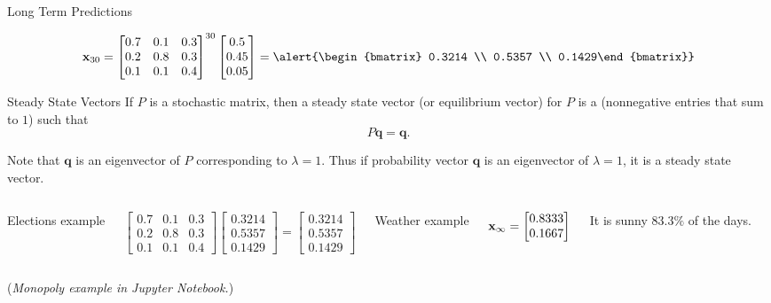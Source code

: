 \documentclass[xcolor=dvipsnames,aspectratio=169,t]{beamer}
\begin{document}
\begin{frame}{Long Term Predictions}
\vspace{-0.1in}

\pause
{\small
\[ \x_{30} =  \begin{bmatrix}
0.7 & 0.1 & 0.3 \\
0.2 & 0.8 & 0.3 \\
0.1 & 0.1 & 0.4 \end{bmatrix}^{30} \begin{bmatrix} 0.5 \\ 0.45 \\ 0.05 \end{bmatrix} = 
\alert{\begin{bmatrix} 0.3214 \\ 0.5357 \\  0.1429\end{bmatrix}} \] }
\end{frame}


\begin{frame}{Steady State Vectors}
  \bbox
  If $P$ is a stochastic matrix, then a \alert{steady state vector} (or \alert{equilibrium vector}) for $P$ is a  (nonnegative entries that sum to $1$) such that 
  \[ P \mathbf{q} = \mathbf{q}. \]

  \bi
  \ii Note that $\mathbf{q}$ is an eigenvector of $P$ corresponding to $\lambda = 1$.
  \ii Thus if probability vector $\mathbf{q}$ is an eigenvector of $\lambda =1$, it is a steady state vector.
  \ei
  \ebox

  \pause
  \begin{columns}[T]
  Elections example

  \[ \begin{bmatrix}
  0.7 & 0.1 & 0.3 \\
  0.2 & 0.8 & 0.3 \\
  0.1 & 0.1 & 0.4 \end{bmatrix} \begin{bmatrix} 0.3214 \\ 0.5357 \\  0.1429\end{bmatrix}  = \begin{bmatrix} 0.3214 \\ 0.5357 \\  0.1429\end{bmatrix} \]
  
  \pause
  
  Weather example
  \smallskip
  
  \qquad $\mathbf{x}_\infty = \begin{bmatrix} 0.8333 \\ 0.1667 \end{bmatrix}$
  \medskip
  
  It is \alert{sunny} $83.3\%$ of the days.
  \end{columns}
  \medskip
  
  \pause
  \hfill {\small (\emph{Monopoly example in Jupyter Notebook.})}
\end{frame}
\end{document}
